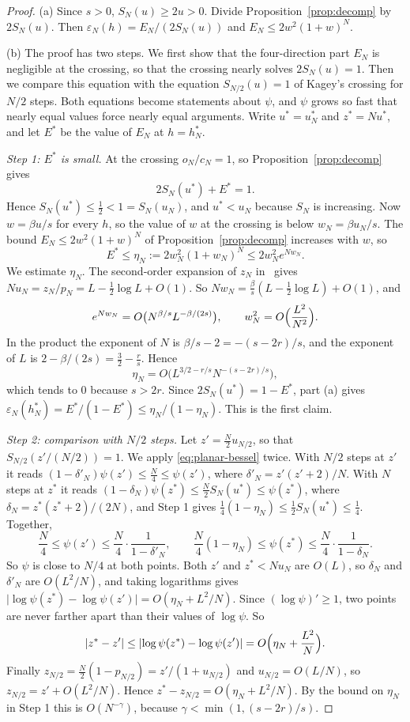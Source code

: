 \begin{proof}
(a) Since $s>0$, $S_N(u)\ge2u>0$. Divide Proposition~\ref{prop:decomp} by $2S_N(u)$. Then
$\varepsilon_N(h)=E_N/(2S_N(u))$ and $E_N\le2w^2(1+w)^N$.

(b) The proof has two steps. We first show that the four-direction part $E_N$ is negligible at the
crossing, so that the crossing nearly solves $2S_N(u)=1$. Then we compare this equation with the
equation $S_{N/2}(u)=1$ of Kagey's crossing for $N/2$ steps. Both equations become statements about
$\psi$, and $\psi$ grows so fast that nearly equal values force nearly equal arguments. Write
$u^*=u^*_N$ and $z^*=Nu^*$, and let $E^*$ be the value of $E_N$ at $h=h^*_N$.

\emph{Step 1: $E^*$ is small.} At the crossing $o_N/c_N=1$, so Proposition~\ref{prop:decomp} gives
\[
 2S_N(u^*)+E^*=1.
\]
Hence $S_N(u^*)\le\frac12<1=S_N(u_N)$, and $u^*<u_N$ because $S_N$ is increasing. Now
$w=\beta u/s$ for every $h$, so the value of $w$ at the crossing is below $w_N=\beta u_N/s$. The
bound $E_N\le2w^2(1+w)^N$ of Proposition~\ref{prop:decomp} increases with $w$, so
\[
 E^*\le\eta_N:=2w_N^2(1+w_N)^N\le2w_N^2e^{Nw_N}.
\]
We estimate $\eta_N$. The second-order expansion of $z_N$
in~\cite[Corollary~3.7(b)]{paperA} gives $Nu_N=z_N/p_N=L-\frac12\log L+O(1)$. So
$Nw_N=\frac\beta s(L-\frac12\log L)+O(1)$, and
\[
 e^{Nw_N}=O\bigl(N^{\beta/s}L^{-\beta/(2s)}\bigr),\qquad w_N^2=O\Bigl(\frac{L^2}{N^2}\Bigr).
\]
In the product the exponent of $N$ is $\beta/s-2=-(s-2r)/s$, and the exponent of $L$ is
$2-\beta/(2s)=\frac32-\frac rs$. Hence
\[
 \eta_N=O\bigl(L^{3/2-r/s}N^{-(s-2r)/s}\bigr),
\]
which tends to $0$ because $s>2r$. Since $2S_N(u^*)=1-E^*$, part (a) gives
$\varepsilon_N(h^*_N)=E^*/(1-E^*)\le\eta_N/(1-\eta_N)$. This is the first claim.

\emph{Step 2: comparison with $N/2$ steps.} Let $z'=\frac N2u_{N/2}$, so that
$S_{N/2}(z'/(N/2))=1$. We apply \eqref{eq:planar-bessel} twice. With $N/2$ steps at $z'$ it reads
$(1-\delta'_N)\psi(z')\le\frac N4\le\psi(z')$, where $\delta'_N=z'(z'+2)/N$. With $N$ steps at $z^*$
it reads $(1-\delta_N)\psi(z^*)\le\frac N2S_N(u^*)\le\psi(z^*)$, where
$\delta_N=z^*(z^*+2)/(2N)$, and Step 1 gives $\frac14(1-\eta_N)\le\frac12S_N(u^*)\le\frac14$.
Together,
\[
 \frac N4\le\psi(z')\le\frac N4\cdot\frac1{1-\delta'_N},\qquad
 \frac N4(1-\eta_N)\le\psi(z^*)\le\frac N4\cdot\frac1{1-\delta_N}.
\]
So $\psi$ is close to $N/4$ at both points. Both $z'$ and $z^*<Nu_N$ are $O(L)$, so $\delta_N$ and
$\delta'_N$ are $O(L^2/N)$, and taking logarithms gives
$\lvert\log\psi(z^*)-\log\psi(z')\rvert=O(\eta_N+L^2/N)$. Since $(\log\psi)'\ge1$, two points are
never farther apart than their values of $\log\psi$. So
\[
 \lvert z^*-z'\rvert\le\lvert\log\psi(z^*)-\log\psi(z')\rvert=O\Bigl(\eta_N+\frac{L^2}N\Bigr).
\]
Finally $z_{N/2}=\frac N2(1-p_{N/2})=z'/(1+u_{N/2})$ and $u_{N/2}=O(L/N)$, so
$z_{N/2}=z'+O(L^2/N)$. Hence $z^*-z_{N/2}=O(\eta_N+L^2/N)$. By the bound on $\eta_N$ in Step 1
this is $O(N^{-\gamma})$, because $\gamma<\min(1,(s-2r)/s)$.


\end{proof}

